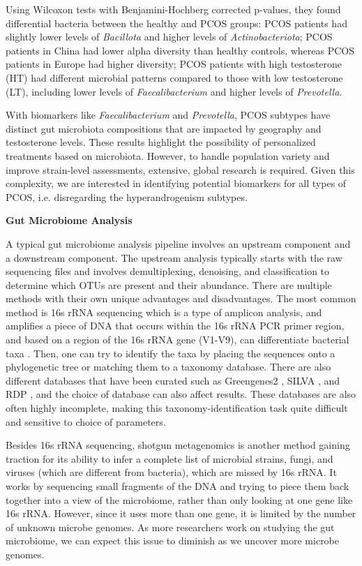 \documentclass[12pt,letterpaper]{article}
\begin{document}
Using Wilcoxon tests with Benjamini-Hochberg corrected p-values, they found differential bacteria between the healthy and PCOS groups: PCOS patients had slightly lower levels of \textit{Bacillota} and higher levels of \textit{Actinobacteriota}; PCOS patients in China had lower alpha diversity than healthy controls, whereas PCOS patients in Europe had higher diversity; PCOS patients with high testosterone (HT) had different microbial patterns compared to those with low testosterone (LT), including lower levels of \textit{Faecalibacterium} and higher levels of \textit{Prevotella}. 

With biomarkers like \textit{Faecalibacterium} and \textit{Prevotella}, PCOS subtypes have distinct gut microbiota compositions that are impacted by geography and testosterone levels. These results highlight the possibility of personalized treatments based on microbiota. However, to handle population variety and improve strain-level assessments, extensive, global research is required. Given this complexity, we are interested in identifying potential biomarkers for all types of PCOS, i.e. disregarding the hyperandrogenism subtypes. \newline

\textbf{Gut Microbiome Analysis}

A typical gut microbiome analysis pipeline involves an upstream component and a downstream component. The upstream analysis typically starts with the raw sequencing files and involves demultiplexing, denoising, and classification to determine which OTUs are present and their abundance. There are multiple methods with their own unique advantages and disadvantages. The most common method is 16s rRNA sequencing which is a type of amplicon analysis, and amplifies a piece of DNA that occurs within the 16s rRNA PCR primer region, and based on a region of the 16s rRNA gene (V1-V9), can differentiate bacterial taxa \citep{allaband2019microbiome101}. Then, one can try to identify the taxa by placing the sequences onto a phylogenetic tree or matching them to a taxonomy database. There are also different databases that have been curated such as Greengenes2 \citep{mcdonald2024greengenes2}, SILVA \citep{pruesse2007silva}, and RDP \citep{cole2014rdp}, and the choice of database can also affect results. These databases are also often highly incomplete, making this taxonomy-identification task quite difficult and sensitive to choice of parameters. 

Besides 16s rRNA sequencing, shotgun metagenomics is another method gaining traction for its ability to infer a complete list of microbial strains, fungi, and viruses (which are different from bacteria), which are missed by 16s rRNA. It works by sequencing small fragments of the DNA and trying to piece them back together into a view of the microbiome, rather than only looking at one gene like 16s rRNA. However, since it uses more than one gene, it is limited by the number of unknown microbe genomes. As more researchers work on studying the gut microbiome, we can expect this issue to diminish as we uncover more microbe genomes. 
\end{document}
